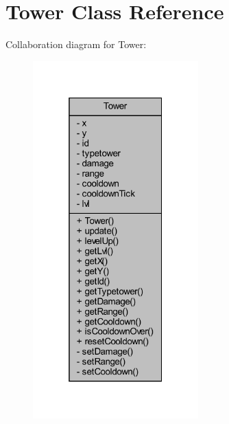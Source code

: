 \hypertarget{classtowers_1_1_tower}{}\section{Tower Class Reference}
\label{classtowers_1_1_tower}


Collaboration diagram for Tower\+:\nopagebreak
\begin{figure}[H]
\begin{center}
\leavevmode
\includegraphics[width=181pt]{classtowers_1_1_tower__coll__graph}
\end{center}
\end{figure}
